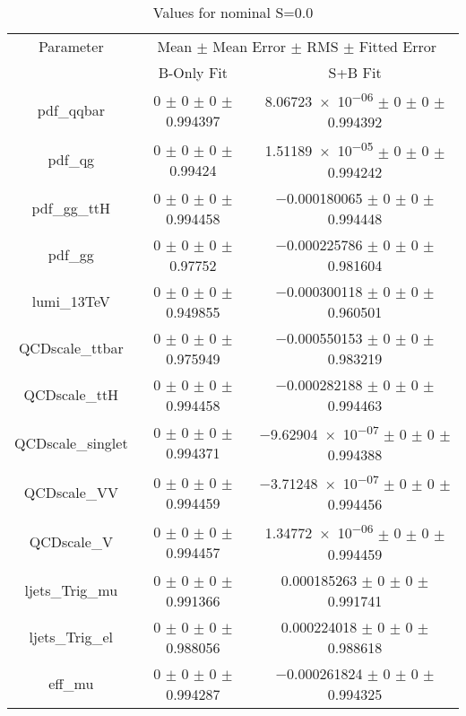 \begin{table}
\centering
\caption{Values for nominal S=0.0}
\begin{tabular}{ccc}
\toprule
Parameter 	& \multicolumn{2}{c}{Mean $\pm$ Mean Error $\pm$ RMS $\pm$ Fitted Error}\\
 	& B-Only Fit & S+B Fit\\
\midrule
pdf\_qqbar 	& \num{0} $\pm$ \num{0} $\pm$ \num{0} $\pm$ \num{0.994397} 	& \num{8.06723e-06} $\pm$ \num{0} $\pm$ \num{0} $\pm$ \num{0.994392}\\
pdf\_qg 	& \num{0} $\pm$ \num{0} $\pm$ \num{0} $\pm$ \num{0.99424} 	& \num{1.51189e-05} $\pm$ \num{0} $\pm$ \num{0} $\pm$ \num{0.994242}\\
pdf\_gg\_ttH 	& \num{0} $\pm$ \num{0} $\pm$ \num{0} $\pm$ \num{0.994458} 	& \num{-0.000180065} $\pm$ \num{0} $\pm$ \num{0} $\pm$ \num{0.994448}\\
pdf\_gg 	& \num{0} $\pm$ \num{0} $\pm$ \num{0} $\pm$ \num{0.97752} 	& \num{-0.000225786} $\pm$ \num{0} $\pm$ \num{0} $\pm$ \num{0.981604}\\
lumi\_13TeV 	& \num{0} $\pm$ \num{0} $\pm$ \num{0} $\pm$ \num{0.949855} 	& \num{-0.000300118} $\pm$ \num{0} $\pm$ \num{0} $\pm$ \num{0.960501}\\
QCDscale\_ttbar 	& \num{0} $\pm$ \num{0} $\pm$ \num{0} $\pm$ \num{0.975949} 	& \num{-0.000550153} $\pm$ \num{0} $\pm$ \num{0} $\pm$ \num{0.983219}\\
QCDscale\_ttH 	& \num{0} $\pm$ \num{0} $\pm$ \num{0} $\pm$ \num{0.994458} 	& \num{-0.000282188} $\pm$ \num{0} $\pm$ \num{0} $\pm$ \num{0.994463}\\
QCDscale\_singlet 	& \num{0} $\pm$ \num{0} $\pm$ \num{0} $\pm$ \num{0.994371} 	& \num{-9.62904e-07} $\pm$ \num{0} $\pm$ \num{0} $\pm$ \num{0.994388}\\
QCDscale\_VV 	& \num{0} $\pm$ \num{0} $\pm$ \num{0} $\pm$ \num{0.994459} 	& \num{-3.71248e-07} $\pm$ \num{0} $\pm$ \num{0} $\pm$ \num{0.994456}\\
QCDscale\_V 	& \num{0} $\pm$ \num{0} $\pm$ \num{0} $\pm$ \num{0.994457} 	& \num{1.34772e-06} $\pm$ \num{0} $\pm$ \num{0} $\pm$ \num{0.994459}\\
ljets\_Trig\_mu 	& \num{0} $\pm$ \num{0} $\pm$ \num{0} $\pm$ \num{0.991366} 	& \num{0.000185263} $\pm$ \num{0} $\pm$ \num{0} $\pm$ \num{0.991741}\\
ljets\_Trig\_el 	& \num{0} $\pm$ \num{0} $\pm$ \num{0} $\pm$ \num{0.988056} 	& \num{0.000224018} $\pm$ \num{0} $\pm$ \num{0} $\pm$ \num{0.988618}\\
eff\_mu 	& \num{0} $\pm$ \num{0} $\pm$ \num{0} $\pm$ \num{0.994287} 	& \num{-0.000261824} $\pm$ \num{0} $\pm$ \num{0} $\pm$ \num{0.994325}\\

\end{tabular}
\end{table}
